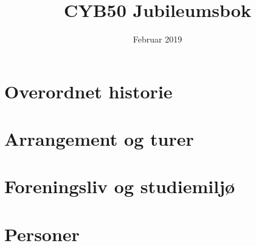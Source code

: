 \documentclass[hidelinks, openany, 12pt, a4paper]{book}
\title{CYB50 Jubileumsbok}
\author{}
\date{Februar 2019}
\begin{document}
\maketitle



\part{Overordnet historie}













\part{Arrangement og turer}









\part{Foreningsliv og studiemiljø}













\part{Personer}











\end{document}
